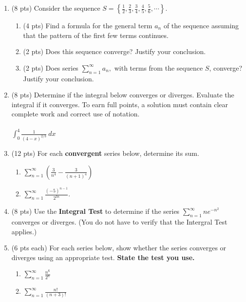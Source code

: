 \documentclass[12pt]{article}
\let\ds\displaystyle
\begin{document}
\newpage
\begin{enumerate}
\item (8 pts) Consider the sequence $S=\left\{\frac{1}{2},\frac{2}{3},\frac{3}{4}, \frac{4}{5}, \frac{5}{6},\cdots \right\}.$
	\begin{enumerate}
	\item (4 pts) Find a formula for the general term $a_n$ of the sequence assuming that the pattern of the first few terms continues.
	\vfill
	\item (2 pts) Does this sequence converge? Justify your conclusion.
	\vfill
	\item (2 pts) Does series $\ds \sum_{n=1}^\infty a_n,$ with terms from the sequence $S$, converge? Justify your conclusion.
	\vfill
	\end{enumerate}
\item (8 pts) Determine if the integral below converges or diverges. Evaluate the integral if it converges. To earn full points, a solution must contain clear complete work and correct use of notation. \\
\quad \\
$\ds \int_0^4 \frac{1}{(4-x)^{2/3}} \: dx$

\vfill

\vfill


\newpage
\item (12 pts) For each \textbf{convergent} series below, determine its sum.  
	\begin{enumerate}
	\item $\ds \sum_{n=1}^{\infty} \left( \frac{3}{n^4}-\frac{3}{(n+1)^4}\right)$
	\vfill
	\item $\ds \sum_{n=1}^\infty \frac{(-5)^{n-1}}{2^{3n}}.$
	\vfill
	\end{enumerate}
\newpage
\item (8 pts) Use the \textbf{Integral Test} to determine if the series $\ds \sum_{n=1}^{\infty} ne^{-n^2}$ converges or diverges. (You do not have to verify that the Intergral Test applies.)

\vfill

\item (6 pts each) For each series below, show whether the series converges or diverges using an appropriate test. \textbf{State the test you use.}

	\begin{enumerate}
	\item $\ds \sum_{n=1}^{\infty} \frac{n^6}{2^n} $

	\vfill
	\newpage
	\item $\ds \sum_{n=1}^{\infty} \frac{n!}{(n+3)!} $


\end{enumerate}
\end{enumerate}
\end{document}
